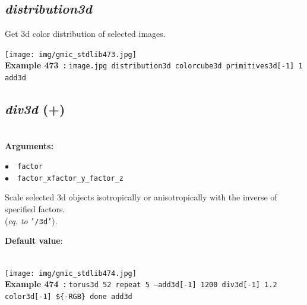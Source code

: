 \documentclass[a4paper,10.5pt,twoside]{book}
\def\comma{\discretionary{,}{}{,}}
\newcommand{\Cb}[1]{\textcolor{cb}{#1}}
\newcommand{\Cc}[1]{\textcolor{cc}{#1}}
\begin{document}
\subsection{\emph{distribution3d} }\vspace*{-0.7em}
Get 3d color distribution of selected images.
\begin{center}\texttt{[image: img/gmic\_stdlib473.jpg]}\\
{\footnotesize \textbf{Example 473~:} \texttt{image.jpg distribution3d colorcube3d primitives3d[-1] 1 add3d}}
\end{center}

\subsection{\emph{div3d} (+)}\vspace*{-0.7em}
~\\\textbf{\Cb{Arguments: }}\begin{flushleft}
{\small \Cb{\hspace*{0.5cm}$\bullet$~~\texttt{factor}}}~~~\\
{\small \Cb{\hspace*{0.5cm}$\bullet$~~\texttt{factor\_x{\comma}factor\_y{\comma}\_factor\_z}}}\end{flushleft}
Scale selected 3d objects isotropically or anisotropically{\comma} with the inverse of specified
factors.
~\\(\emph{eq. to} {\small \texttt{'/3d'}}).
\begin{flushleft}\Cc{\textbf{Default value}:\\~\\\hspace*{0.5cm}{\small $\bullet$~~\texttt{'factor\_z=0'.}}}\end{flushleft}
\begin{center}\texttt{[image: img/gmic\_stdlib474.jpg]}\\
{\footnotesize \textbf{Example 474~:} \texttt{torus3d 5{\comma}2 repeat 5 --add3d[-1] 12{\comma}0{\comma}0 div3d[-1] 1.2 color3d[-1] \$\{-RGB\} done add3d}}
\end{center}
\end{document}

